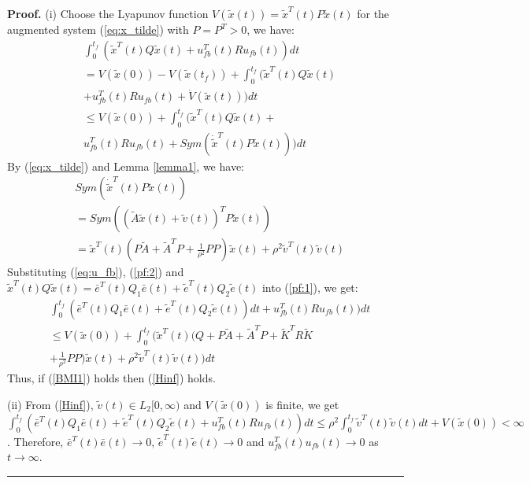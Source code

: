 \documentclass{ieeeaccess}
\newenvironment{proof}[1][Proof]{\noindent\textbf{#1.} }{\ \rule{0.5em}{0.5em}}
\begin{document}
\begin{proof}
    (i) Choose the Lyapunov function $V(\tilde{x}(t))=\tilde{x}^T(t)P\tilde{x}(t)$ for the augmented system (\ref{eq:x_tilde}) with $P=P^T>0$, we have:
    \begin{equation} \label{pf:1}
        \begin{split}
            & \int_{0}^{t_f}(\tilde{x}^T(t)Q\tilde{x}(t) + u_{fb}^T(t)Ru_{fb}(t))dt \\
            & = V(\tilde{x}(0)) - V(\tilde{x}(t_f)) + \int_{0}^{t_f}(\tilde{x}^T(t)Q\tilde{x}(t) \\
            & + u_{fb}^T(t)Ru_{fb}(t) + \dot{V}(\tilde{x}(t)))dt \\
            & \leq V(\tilde{x}(0)) + \int_{0}^{t_f}(\tilde{x}^T(t)Q\tilde{x}(t) + \\
            & u_{fb}^T(t)Ru_{fb}(t) + Sym(\dot{\tilde{x}}^T(t)P\tilde{x}(t)))dt
        \end{split}
    \end{equation}
    By (\ref{eq:x_tilde}) and Lemma \ref{lemma1}, we have:
    \begin{equation} \label{pf:2}
        \begin{split}
            & Sym(\dot{\tilde{x}}^T(t)P\tilde{x}(t)) \\
            & = Sym((\tilde{A}\tilde{x}(t)+\tilde{v}(t))^TP\tilde{x}(t)) \\
            & = \tilde{x}^T(t)(P\tilde{A} + \tilde{A}^T P + \frac{1}{\rho^2}PP)\tilde{x}(t) + \rho^2\tilde{v}^T(t)\tilde{v}(t)
        \end{split}
    \end{equation}
    Substituting (\ref{eq:u_fb}), (\ref{pf:2}) and $\tilde{x}^T(t)Q\tilde{x}(t)=\bar{e}^T(t)Q_1\bar{e}(t)+\tilde{e}^T(t)Q_2\tilde{e}(t)$ into (\ref{pf:1}), we get:
    \begin{equation*} \label{pf:3}
        \begin{split}
            & \int_{0}^{t_f}(\bar{e}^T(t)Q_1\bar{e}(t)+\tilde{e}^T(t)Q_2\tilde{e}(t))dt + u_{fb}^T(t)Ru_{fb}(t))dt \\
            & \leq V(\tilde{x}(0)) + \int_{0}^{t_f}(\tilde{x}^T(t)(Q + P\tilde{A} + \tilde{A}^T P +\tilde{K}^TR\tilde{K}\\
            & + \frac{1}{\rho^2}PP)\tilde{x}(t) + \rho^2\tilde{v}^T(t)\tilde{v}(t))dt
        \end{split}
    \end{equation*}
    Thus, if (\ref{BMI1}) holds then (\ref{Hinf}) holds.

    (ii) From (\ref{Hinf}), $\tilde{v}(t)\in L_2[0, \infty)$ and $V(\tilde{x}(0))$ is finite, we get $\int_{0}^{t_f}(\bar{e}^T(t)Q_1\bar{e}(t) + \tilde{e}^T(t)Q_2\tilde{e}(t) + u_{fb}^T(t)Ru_{fb}(t))dt 
    \leq \rho^2 \int_{0}^{t_f}\tilde{v}^T(t)\tilde{v}(t)dt + V(\tilde{x}(0)) 
    < \infty$. Therefore, $\bar{e}^T(t)\bar{e}(t)\rightarrow 0$, $\tilde{e}^T(t)\tilde{e}(t)\rightarrow 0$ and $u_{fb}^T(t)u_{fb}(t)\rightarrow 0$ as $t\rightarrow \infty$.
\end{proof}
\end{document}
